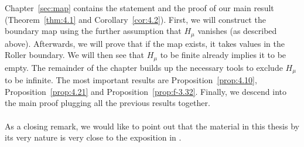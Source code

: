 Chapter~\ref{sec:map} contains the statement and the proof of our main result (Theorem~\ref{thm:4.1} and Corollary~\ref{cor:4.2}). First, we will construct the boundary map using the further assumption that \(H_\mu\) vanishes (as described above). Afterwards, we will prove that if the map exists, it takes values in the Roller boundary. We will then see that \(H_\mu\) to be finite already implies it to be empty. The remainder of the chapter builds up the necessary tools to exclude \(H_\mu\) to be infinite. The most important results are Proposition~\ref{prop:4.10}, Proposition~\ref{prop:4.21} and Proposition~\ref{prop:f-3.32}. Finally, we descend into the main proof plugging all the previous results together.
\\
\\
As a closing remark, we would like to point out that the material in this thesis by its very nature is very close to the exposition in \textcite{MR3509968}.
